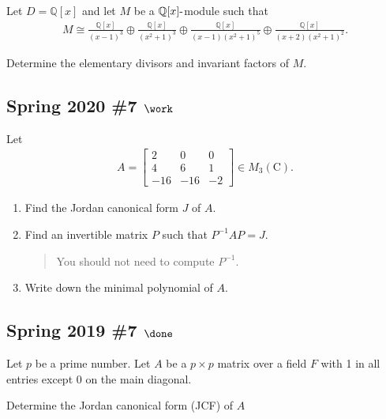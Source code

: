 Let \(D = {\mathbb{Q}}[x]\) and let \(M\) be a
\({\mathbb{Q}}[x]{\hbox{-}}\)module such that
\begin{align*}
M \cong \frac{\mathbb{Q}[x]}{(x-1)^{3}} \oplus \frac{\mathbb{Q}[x]}{\left(x^{2}+1\right)^{3}} \oplus \frac{\mathbb{Q}[x]}{(x-1)\left(x^{2}+1\right)^{5}} \oplus \frac{\mathbb{Q}[x]}{(x+2)\left(x^{2}+1\right)^{2}}
.\end{align*}

Determine the elementary divisors and invariant factors of \(M\).

\hypertarget{spring-2020-7-work}{%
\subsection{\texorpdfstring{Spring 2020 \#7
\(\work\)}{Spring 2020 \#7 \textbackslash work}}\label{spring-2020-7-work}}

Let
\begin{align*}
A=\left[\begin{array}{ccc}
2 & 0 & 0 \\
4 & 6 & 1 \\
-16 & -16 & -2
\end{array}\right] \in M_{3}(\mathrm{C})
.\end{align*}

\begin{enumerate}
\def\labelenumi{\alph{enumi}.}
\item
  Find the Jordan canonical form \(J\) of \(A\).
\item
  Find an invertible matrix \(P\) such that \(P^{-1}A P = J\).

  \begin{quote}
  You should not need to compute \(P^{-1}\).
  \end{quote}
\item
  Write down the minimal polynomial of \(A\).
\end{enumerate}

\hypertarget{spring-2019-7-done}{%
\subsection{\texorpdfstring{Spring 2019 \#7
\(\done\)}{Spring 2019 \#7 \textbackslash done}}\label{spring-2019-7-done}}

Let \(p\) be a prime number. Let \(A\) be a \(p \times p\) matrix over a
field \(F\) with 1 in all entries except 0 on the main diagonal.

Determine the Jordan canonical form (JCF) of \(A\)

